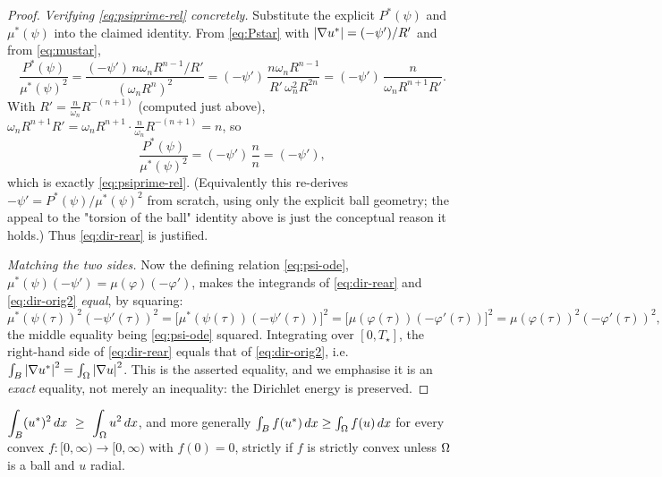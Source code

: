 \begin{proof}
\emph{Verifying \eqref{eq:psiprime-rel} concretely.} Substitute the explicit
$P^*(\psi)$ and $\mu^*(\psi)$ into the claimed identity. From \eqref{eq:Pstar}
with $\left|\nabla u^*\right|=(-\psi')/R'$ and from \eqref{eq:mustar},
\[
  \frac{P^*(\psi)}{\mu^*(\psi)^2}
  =\frac{(-\psi')\,n\omega_n R^{n-1}/R'}{(\omega_n R^n)^2}
  =(-\psi')\,\frac{n\omega_n R^{n-1}}{R'\,\omega_n^2 R^{2n}}
  =(-\psi')\,\frac{n}{\omega_n R^{n+1}R'} .
\]
With $R'=\tfrac{n}{\omega_n}R^{-(n+1)}$ (computed just above),
$\omega_n R^{n+1}R'=\omega_n R^{n+1}\cdot\tfrac{n}{\omega_n}R^{-(n+1)}=n$, so
\[
  \frac{P^*(\psi)}{\mu^*(\psi)^2}=(-\psi')\,\frac{n}{n}=(-\psi'),
\]
which is exactly \eqref{eq:psiprime-rel}. (Equivalently this re-derives
$-\psi'=P^*(\psi)/\mu^*(\psi)^2$ from scratch, using only the explicit ball
geometry; the appeal to the "torsion of the ball" identity above is just the
conceptual reason it holds.) Thus \eqref{eq:dir-rear} is justified.

\emph{Matching the two sides.} Now the defining relation \eqref{eq:psi-ode},
$\mu^*(\psi)(-\psi')=\mu(\varphi)(-\varphi')$, makes the integrands of
\eqref{eq:dir-rear} and \eqref{eq:dir-orig2} \emph{equal}, by squaring:
\[
  \mu^*(\psi(\tau))^2(-\psi'(\tau))^2
  =\bigl[\mu^*(\psi(\tau))(-\psi'(\tau))\bigr]^2
  =\bigl[\mu(\varphi(\tau))(-\varphi'(\tau))\bigr]^2
  =\mu(\varphi(\tau))^2(-\varphi'(\tau))^2 ,
\]
the middle equality being \eqref{eq:psi-ode} squared. Integrating over
$[0,T_\star]$, the right-hand side of \eqref{eq:dir-rear} equals that of
\eqref{eq:dir-orig2}, i.e.\
$\int_B\left|\nabla u^*\right|^2=\int_\Omega\left|\nabla u\right|^2$. This is the asserted
equality, and we emphasise it is an \emph{exact} equality, not merely an
inequality: the Dirichlet energy is preserved.
\end{proof}

\begin{lemma}\label{lem:B}
$\displaystyle\int_B(u^*)^2\,dx\ \ge\ \int_\Omega u^2\,dx$, and more generally
$\int_B f(u^*)\,dx\ge\int_\Omega f(u)\,dx$ for every convex
$f:[0,\infty)\to[0,\infty)$ with $f(0)=0$, strictly if $f$ is strictly
convex unless $\Omega$ is a ball and $u$ radial.
\end{lemma}

